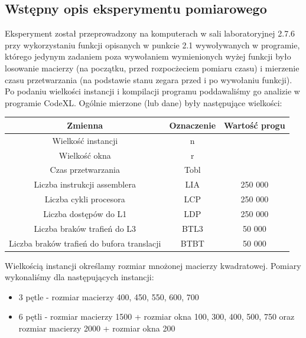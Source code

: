 \documentclass[10pt,a4paper]{article}
\begin{document}
\subsection{Wstępny opis eksperymentu pomiarowego}
Eksperyment został przeprowadzony na komputerach w sali laboratoryjnej 2.7.6 przy
wykorzystaniu funkcji opisanych w punkcie 2.1 wywoływanych w programie, którego jedynym
zadaniem poza wywołaniem wymienionych wyżej funkcji było losowanie macierzy
(na początku, przed rozpocżeciem pomiaru czasu) i mierzenie czasu przetwarzania
(na podstawie stanu zegara przed i po wywołaniu funkcji). Po podaniu wielkości instancji
i kompilacji programu poddawaliśmy go analizie w programie CodeXL. Ogólnie mierzone (lub dane)
były następujące wielkości:
\begin{center}
	\begin{tabular}{ |c|c|c| }
		\hline
		Zmienna                                      & Oznaczenie & Wartość progu \\
		\hline
		Wielkość instancji                         & n          &                 \\
		Wielkość okna                              & r          &                 \\
		Czas przetwarzania                           & Tobl       &                 \\
		Liczba instrukcji assemblera                 & LIA        & 250 000         \\
		Liczba cykli procesora                       & LCP        & 250 000         \\
		Liczba dostępów do L1                      & LDP        & 250 000         \\
		Liczba braków trafień do L3                & BTL3       & 50 000          \\
		Liczba braków trafień do bufora translacji & BTBT       & 50 000          \\
		\hline
	\end{tabular}
\end{center}
Wielkością instancji określamy rozmiar mnożonej macierzy kwadratowej.
Pomiary wykonaliśmy dla następujących instancji:
\begin{itemize}
	\item 3 pętle - rozmiar macierzy 400, 450, 550, 600, 700
	\item 6 pętli - rozmiar macierzy 1500 + rozmiar okna 100, 300, 400, 500, 750 oraz \\rozmiar macierzy 2000 + rozmiar okna 200
\end{itemize}
\end{document}
